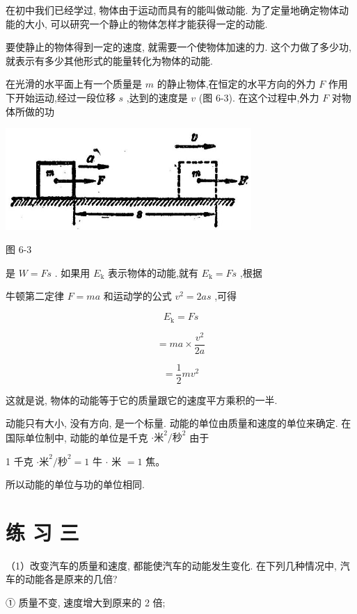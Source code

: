 \documentclass[10pt]{article}
\begin{document}
在初中我们已经学过, 物体由于运动而具有的能叫做动能. 为了定量地确定物体动能的大小, 可以研究一个静止的物体怎样才能获得一定的动能.

要使静止的物体得到一定的速度, 就需要一个使物体加速的力. 这个力做了多少功, 就表示有多少其他形式的能量转化为物体的动能.

在光滑的水平面上有一个质量是 \(m\) 的静止物体,在恒定的水平方向的外力 \(F\) 作用下开始运动,经过一段位移 \(s\) ,达到的速度是 \(v\) (图 6-3). 在这个过程中,外力 \(F\) 对物体所做的功

\begin{center}
\includegraphics[max width=0.7\textwidth]{images/01912d55-147c-70aa-b0e0-1782a122f948_174_364109.jpg}
\end{center}

图 6-3

是 \(W = {Fs}\) . 如果用 \({E}_{\mathrm{k}}\) 表示物体的动能,就有 \({E}_{\mathrm{k}} = {Fs}\) ,根据

牛顿第二定律 \(F = {ma}\) 和运动学的公式 \({v}^{2} = {2as}\) ,可得

\[
{E}_{\mathrm{k}} = {Fs}
\]

\[
= {ma} \times \frac{{v}^{2}}{2a}
\]

\[
= \frac{1}{2}m{v}^{2}
\]

这就是说, 物体的动能等于它的质量跟它的速度平方乘积的一半.

动能只有大小, 没有方向, 是一个标量. 动能的单位由质量和速度的单位来确定. 在国际单位制中, 动能的单位是千克 \(\cdot {\text{米}}^{2}/{\text{秒}}^{2}\) 由于

1 千克 \(\cdot {\text{米}}^{2}/{\text{秒}}^{2} = 1\) 牛 \(\cdot\) 米 \(= 1\) 焦。

所以动能的单位与功的单位相同.

\section*{练 习 三}

（1）改变汽车的质量和速度, 都能使汽车的动能发生变化. 在下列几种情况中, 汽车的动能各是原来的几倍?

① 质量不变, 速度增大到原来的 2 倍;
\end{document}
